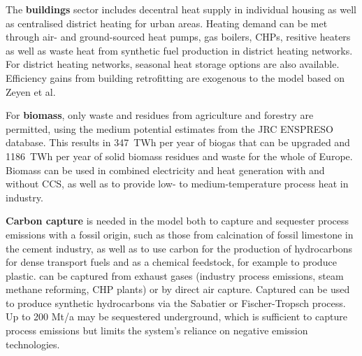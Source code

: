 The \textbf{buildings} sector includes decentral heat supply in individual
housing as well as centralised district heating for urban areas. Heating demand
can be met through air- and ground-sourced heat pumps, gas boilers, CHPs,
resitive heaters as well as waste heat from synthetic fuel production in
district heating networks. For district heating networks, seasonal heat storage
options are also available. Efficiency gains from building retrofitting are
exogenous to the model based on Zeyen et al.\cite{zeyenMitigatingHeat2021}

For \textbf{biomass}, only waste and residues from agriculture and forestry are
permitted, using the medium potential estimates from the JRC ENSPRESO database.
\cite{ruizENSPRESOOpen2019} This results in 347~TWh per year of biogas that can
be upgraded and 1186~TWh per year of solid biomass residues and waste for the
whole of Europe. Biomass can be used in combined electricity and heat generation
with and without CCS, as well as to provide low- to medium-temperature process
heat in industry.

\textbf{Carbon capture} is needed in the model both to capture and sequester
process emissions with a fossil origin, such as those from calcination of fossil
limestone in the cement industry, as well as to use carbon for the production of
hydrocarbons for dense transport fuels and as a chemical feedstock, for example
to produce plastic. \co can be captured from exhaust gases (industry process
emissions, steam methane reforming, CHP plants) or by direct air capture.
Captured \co can be used to produce synthetic hydrocarbons via the Sabatier or
Fischer-Tropsch process. Up to 200 Mt\co/a may be sequestered underground, which
is sufficient to capture process emissions but limits the system's reliance on
negative emission technologies.